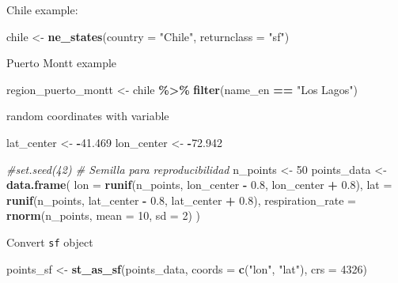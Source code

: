 \documentclass[
]{book}
\newenvironment{Shaded}{\begin{snugshade}}{\end{snugshade}}
\newcommand{\AttributeTok}[1]{\textcolor[rgb]{0.13,0.29,0.53}{#1}}
\newcommand{\CommentTok}[1]{\textcolor[rgb]{0.56,0.35,0.01}{\textit{#1}}}
\newcommand{\DecValTok}[1]{\textcolor[rgb]{0.00,0.00,0.81}{#1}}
\newcommand{\FloatTok}[1]{\textcolor[rgb]{0.00,0.00,0.81}{#1}}
\newcommand{\FunctionTok}[1]{\textcolor[rgb]{0.13,0.29,0.53}{\textbf{#1}}}
\newcommand{\NormalTok}[1]{#1}
\newcommand{\OtherTok}[1]{\textcolor[rgb]{0.56,0.35,0.01}{#1}}
\newcommand{\SpecialCharTok}[1]{\textcolor[rgb]{0.81,0.36,0.00}{\textbf{#1}}}
\newcommand{\StringTok}[1]{\textcolor[rgb]{0.31,0.60,0.02}{#1}}
\begin{document}
Chile example:

\begin{Shaded}
\begin{Highlighting}[]
\NormalTok{chile }\OtherTok{\textless{}{-}} \FunctionTok{ne\_states}\NormalTok{(}\AttributeTok{country =} \StringTok{"Chile"}\NormalTok{, }\AttributeTok{returnclass =} \StringTok{"sf"}\NormalTok{)}
\end{Highlighting}
\end{Shaded}

Puerto Montt example

\begin{Shaded}
\begin{Highlighting}[]
\NormalTok{region\_puerto\_montt }\OtherTok{\textless{}{-}}\NormalTok{ chile }\SpecialCharTok{\%\textgreater{}\%}
  \FunctionTok{filter}\NormalTok{(name\_en }\SpecialCharTok{==} \StringTok{"Los Lagos"}\NormalTok{)}
\end{Highlighting}
\end{Shaded}

random coordinates with variable

\begin{Shaded}
\begin{Highlighting}[]
\NormalTok{lat\_center }\OtherTok{\textless{}{-}} \SpecialCharTok{{-}}\FloatTok{41.469}
\NormalTok{lon\_center }\OtherTok{\textless{}{-}} \SpecialCharTok{{-}}\FloatTok{72.942}

\CommentTok{\#set.seed(42)  \# Semilla para reproducibilidad}
\NormalTok{n\_points }\OtherTok{\textless{}{-}} \DecValTok{50}
\NormalTok{points\_data }\OtherTok{\textless{}{-}} \FunctionTok{data.frame}\NormalTok{(}
  \AttributeTok{lon =} \FunctionTok{runif}\NormalTok{(n\_points, lon\_center }\SpecialCharTok{{-}} \FloatTok{0.8}\NormalTok{, lon\_center }\SpecialCharTok{+} \FloatTok{0.8}\NormalTok{),}
  \AttributeTok{lat =} \FunctionTok{runif}\NormalTok{(n\_points, lat\_center }\SpecialCharTok{{-}} \FloatTok{0.8}\NormalTok{, lat\_center }\SpecialCharTok{+} \FloatTok{0.8}\NormalTok{),}
  \AttributeTok{respiration\_rate =} \FunctionTok{rnorm}\NormalTok{(n\_points, }\AttributeTok{mean =} \DecValTok{10}\NormalTok{, }\AttributeTok{sd =} \DecValTok{2}\NormalTok{)  }
\NormalTok{)}
\end{Highlighting}
\end{Shaded}

Convert \texttt{sf} object

\begin{Shaded}
\begin{Highlighting}[]
\NormalTok{points\_sf }\OtherTok{\textless{}{-}} \FunctionTok{st\_as\_sf}\NormalTok{(points\_data, }\AttributeTok{coords =} \FunctionTok{c}\NormalTok{(}\StringTok{"lon"}\NormalTok{, }\StringTok{"lat"}\NormalTok{), }\AttributeTok{crs =} \DecValTok{4326}\NormalTok{)}
\end{Highlighting}
\end{Shaded}
\end{document}
